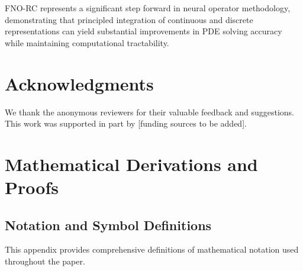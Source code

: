 \documentclass[11pt,twocolumn]{article}
\begin{document}
FNO-RC represents a significant step forward in neural operator methodology, demonstrating that principled integration of continuous and discrete representations can yield substantial improvements in PDE solving accuracy while maintaining computational tractability.

\section*{Acknowledgments}

We thank the anonymous reviewers for their valuable feedback and suggestions. This work was supported in part by [funding sources to be added].

\appendix

\section{Mathematical Derivations and Proofs}
\label{app:derivations}

\subsection{Notation and Symbol Definitions}
\label{app:notation}

This appendix provides comprehensive definitions of mathematical notation used throughout the paper.
\end{document}
